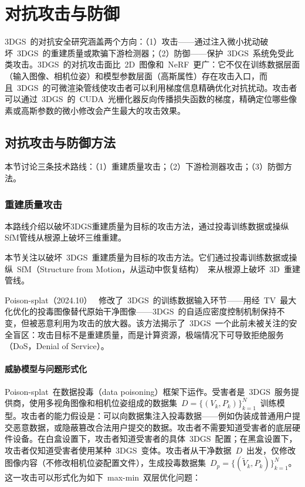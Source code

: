 \section{对抗攻击与防御}
\label{sec:21_2}

3DGS~的对抗安全研究涵盖两个方向：（1）攻击——通过注入微小扰动破坏~3DGS~的重建质量或欺骗下游检测器；（2）防御——保护~3DGS~系统免受此类攻击。3DGS~的对抗攻击面比~2D~图像和~NeRF~更广：它不仅在训练数据层面（输入图像、相机位姿）和模型参数层面（高斯属性）存在攻击入口，而且~3DGS~的可微渲染管线使攻击者可以利用梯度信息精确优化对抗扰动。攻击者可以通过~3DGS~的~CUDA~光栅化器反向传播损失函数的梯度，精确定位哪些像素或高斯参数的微小修改会产生最大的攻击效果。

\subsection{对抗攻击与防御方法}
\label{ss:21_2}

本节讨论三条技术路线：（1）重建质量攻击；（2）下游检测器攻击；（3）防御方法。

\subsubsection{重建质量攻击}

本路线介绍以破坏3DGS重建质量为目标的攻击方法，通过投毒训练数据或操纵SfM管线从根源上破坏三维重建。

本节关注以破坏~3DGS~重建质量为目标的攻击方法。它们通过投毒训练数据或操纵~SfM（Structure from Motion，从运动中恢复结构）~来从根源上破坏~3D~重建管线。

Poison-splat（2024.10）~\cite{2410_08190} 修改了~3DGS~的训练数据输入环节——用经~TV~最大化优化的投毒图像替代原始干净图像——3DGS~的自适应密度控制机制保持不变，但被恶意利用为攻击的放大器。该方法揭示了~3DGS~一个此前未被关注的安全盲区：攻击目标不是重建质量，而是计算资源，极端情况下可导致拒绝服务（DoS，Denial of Service）。

\paragraph{威胁模型与问题形式化}

Poison-splat~在数据投毒（data poisoning）框架下运作。受害者是~3DGS~服务提供商，使用多视角图像和相机位姿组成的数据集~$D = \{(V_k, P_k)\}_{k=1}^N$~训练模型。攻击者的能力假设是：可以向数据集注入投毒数据——例如伪装成普通用户提交恶意数据，或隐蔽篡改合法用户提交的数据。攻击者不需要知道受害者的底层硬件设备。在白盒设置下，攻击者知道受害者的具体~3DGS~配置；在黑盒设置下，攻击者仅知道受害者使用某种~3DGS~变体。攻击者从干净数据~$D$~出发，仅修改图像内容（不修改相机位姿配置文件），生成投毒数据集~$D_p = \{(\tilde{V}_k, P_k)\}_{k=1}^N$。这一攻击可以形式化为如下~max-min~双层优化问题：


